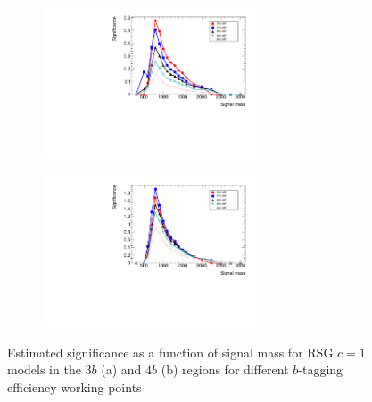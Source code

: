 \begin{figure}[h!]
  \centering
  \captionsetup{justification=centering}

   \begin{subfigure}[t]{0.5\textwidth}
        \centering
        \includegraphics[width=0.7\textwidth,angle=270]{figures/sig_optimization_3b}
        \caption{}
    \end{subfigure}%
    \begin{subfigure}[t]{0.5\textwidth}
        \centering
        \includegraphics[width=0.7\textwidth,angle=270]{figures/sig_optimization_4b}
        \caption{}
    \end{subfigure}

   \caption{Estimated significance as a function of signal mass for RSG $c=1$ models in the $3b$ (a) and $4b$ (b) regions for different $b$-tagging efficiency working points}
  \label{fig:4b_sig_opt}
\end{figure}
